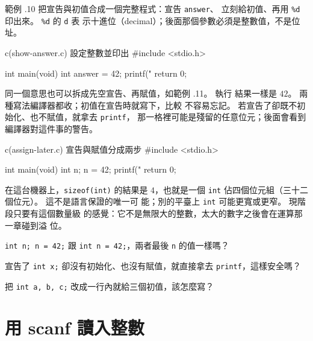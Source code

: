 範例 \thechapter.10 把宣告與初值合成一個完整程式：宣告 \texttt{answer}、
立刻給初值、再用 \texttt{\%d} 印出來。 \texttt{\%d} 的 \texttt{d} 表
示十進位（decimal）；後面那個參數必須是整數值，不是位址。

\begin{example}{c}{(show-answer.c) 設定整數並印出}
#include <stdio.h>

int main(void) {
    int answer = 42;
    printf("%
    return 0;
}
\end{example}


同一個意思也可以拆成先空宣告、再賦值，如範例 \thechapter.11。 執行
結果一樣是 $42$。 兩種寫法編譯器都收；初值在宣告時就寫下，比較
不容易忘記。 若宣告了卻既不初始化、也不賦值，就拿去 \texttt{printf}，
那一格裡可能是殘留的任意位元；後面會看到編譯器對這件事的警告。

\begin{example}{c}{(assign-later.c) 宣告與賦值分成兩步}
#include <stdio.h>

int main(void) {
    int n;
    n = 42;
    printf("%
    return 0;
}
\end{example}


在這台機器上，\texttt{sizeof(int)} 的結果是 $4$，也就是一個
\texttt{int} 佔四個位元組（三十二個位元）。 這不是語言保證的唯一可
能；別的平臺上 \texttt{int} 可能更寬或更窄。 現階段只要有這個數量級
的感覺：它不是無限大的整數，太大的數字之後會在運算那一章碰到溢
位。



\begin{drills}[label=drills:basic-init-assign]
\item \texttt{int n; n = 42;} 跟 \texttt{int n = 42;}，兩者最後
\texttt{n} 的值一樣嗎？
\item 宣告了 \texttt{int x;} 卻沒有初始化、也沒有賦值，就直接拿去
\texttt{printf}，這樣安全嗎？
\item 把 \texttt{int a, b, c;} 改成一行內就給三個初值，該怎麼寫？
\end{drills}

\section{用 scanf 讀入整數}
\label{sec:basic-scanf}

